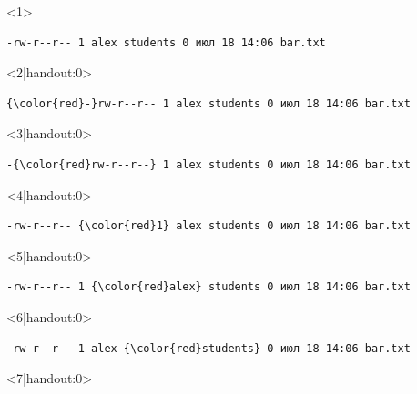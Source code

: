 \documentclass[handout]{beamer}
\begin{document}
\begin{frame}[fragile]
	\begin{onlyenv}
		\begin{Verbatim}[commandchars=\\\{\},codes={\catcode`$=3\catcode`^=7\catcode`_=8}]
-rw-r--r-- 1 alex students 0 июл 18 14:06 bar.txt
		\end{Verbatim}
	\end{onlyenv}
	\begin{onlyenv}<2|handout:0>
		\begin{Verbatim}[commandchars=\\\{\},codes={\catcode`$=3\catcode`^=7\catcode`_=8}]
{\color{red}-}rw-r--r-- 1 alex students 0 июл 18 14:06 bar.txt
		\end{Verbatim}
	\end{onlyenv}
	\begin{onlyenv}<3|handout:0>
		\begin{Verbatim}[commandchars=\\\{\},codes={\catcode`$=3\catcode`^=7\catcode`_=8}]
-{\color{red}rw-r--r--} 1 alex students 0 июл 18 14:06 bar.txt
		\end{Verbatim}
	\end{onlyenv}
	\begin{onlyenv}<4|handout:0>
		\begin{Verbatim}[commandchars=\\\{\},codes={\catcode`$=3\catcode`^=7\catcode`_=8}]
-rw-r--r-- {\color{red}1} alex students 0 июл 18 14:06 bar.txt
		\end{Verbatim}
	\end{onlyenv}
	\begin{onlyenv}<5|handout:0>
		\begin{Verbatim}[commandchars=\\\{\},codes={\catcode`$=3\catcode`^=7\catcode`_=8}]
-rw-r--r-- 1 {\color{red}alex} students 0 июл 18 14:06 bar.txt
		\end{Verbatim}
	\end{onlyenv}
	\begin{onlyenv}<6|handout:0>
		\begin{Verbatim}[commandchars=\\\{\},codes={\catcode`$=3\catcode`^=7\catcode`_=8}]
-rw-r--r-- 1 alex {\color{red}students} 0 июл 18 14:06 bar.txt
		\end{Verbatim}
	\end{onlyenv}
	\begin{onlyenv}<7|handout:0>
		\begin{Verbatim}[commandchars=\\\{\},codes={\catcode`$=3\catcode`^=7\catcode`_=8}]

\end{Verbatim}
\end{onlyenv}
\end{frame}
\end{document}
